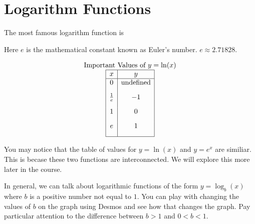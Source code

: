 \documentclass[nooutcomes]{ximera}
\begin{document}
\newpage


\section{Logarithm Functions}


The most famous logarithm function is
\begin{image}
\end{image}
 
Here $e$ is the mathematical constant known as Euler's number. $e \approx 2.71828$.

\begin{image}
\end{image}



\[
\begin{array}{ c  }
  \text{Important Values of $y=\ln(x)$}\\
 \begin{array}{|c|c|}
 \hline
 x & y\\
 \hline
0&\text{undefined}\\[2ex]
\frac{1}{e}&-1\\[2ex]
1&0\\[2ex]
e&1\\[2ex]
 \hline
 \end{array}
\end{array}
 \]


You may notice that the table of values for $y=\ln(x)$ and $y=e^x$ are similiar.  This is becase these two functions are interconnected.  We will explore this more later in the course.



In general, we can talk about logarithmic functions of the form $y=\log_b(x)$ where $b$ is a positive number not equal to $1$.  You can play with changing the values of $b$ on the graph using Desmos and see how that changes the graph.  Pay particular attention to the difference between $b>1$ and $0<b<1$.
\end{document}
